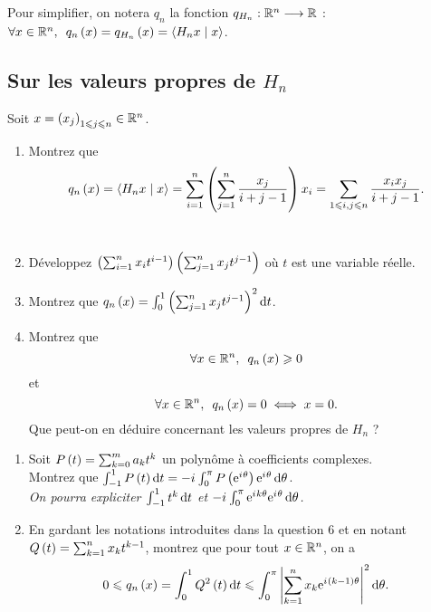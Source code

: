 Pour simplifier, on notera \(q_n\) la fonction \(q_{H_n}:\mathbb{R}^n\longrightarrow\mathbb{R}\) : \(\quantifs{\forall x\in\R^n}q_n\paren{x}=q_{H_n}\paren{x}=\ps{H_nx}{x}\).

\subsection*{Sur les valeurs propres de \(H_n\)}

\begin{q}
Soit \(x=\left(x_j\right)_{1\leqslant j\leqslant n}\in\mathbb{R}^n\).

\begin{enumerate}
    \item Montrez que \[q_n\left(x\right)=\left\langle H_nx\;\middle|\; x\right\rangle=\sum_{i=1}^n\left(\sum_{j=1}^n\dfrac{x_j}{i+j-1}\right)x_i=\sum_{1\leqslant i,j\leqslant n}\dfrac{x_ix_j}{i+j-1}.\] \\
    \item Développez \(\left(\sum_{i=1}^nx_it^{i-1}\right)\left(\sum_{j=1}^nx_jt^{j-1}\right)\) où \(t\) est une variable réelle. \\
    \item Montrez que \(q_n\paren{x}=\int_0^1\paren{\sum_{j=1}^nx_jt^{j-1}}^2\odif{t}\). \\
    \item Montrez que \[\quantifs{\forall x\in\R^n}q_n\paren{x}\geq0\] et \[\quantifs{\forall x\in\R^n}q_n\paren{x}=0\ssi x=0.\] Que peut-on en déduire concernant les valeurs propres de \(H_n\) ?
\end{enumerate}
\end{q}

\begin{q}
\begin{enumerate}
    \item Soit \(P\left(t\right)=\sum_{k=0}^ma_kt^k\) un polynôme à coefficients complexes. \\ Montrez que \(\int_{-1}^1P\paren{t}\odif{t}=-\i\int_0^\pi P\paren{\e{\i\theta}}\e{\i\theta}\odif{\theta}\). \\ \textit{On pourra expliciter \(\int_{-1}^1t^k\odif{t}\) et \(-\i\int_0^\pi\e{\i k\theta}\e{\i\theta}\odif{\theta}\).} \\
    \item En gardant les notations introduites dans la question 6 et en notant \(Q\left(t\right)=\sum_{k=1}^nx_kt^{k-1}\), montrez que pour tout \(x\in\mathbb{R}^n\), on a \[0\leq q_n\paren{x}=\int_0^1Q^2\paren{t}\odif{t}\leq\int_0^\pi\abs{\sum_{k=1}^nx_k\e{\i\paren{k-1}\theta}}^2\odif{\theta}.\]
\end{enumerate}
\end{q}

